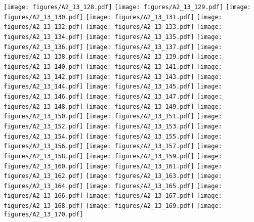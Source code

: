 \documentclass[12pt,a4paper]{article}
\begin{document}
\texttt{[image: figures/A2\_13\_128.pdf]}
\texttt{[image: figures/A2\_13\_129.pdf]}
\texttt{[image: figures/A2\_13\_130.pdf]}
\texttt{[image: figures/A2\_13\_131.pdf]}
\texttt{[image: figures/A2\_13\_132.pdf]}
\texttt{[image: figures/A2\_13\_133.pdf]}
\texttt{[image: figures/A2\_13\_134.pdf]}
\texttt{[image: figures/A2\_13\_135.pdf]}
\texttt{[image: figures/A2\_13\_136.pdf]}
\texttt{[image: figures/A2\_13\_137.pdf]}
\texttt{[image: figures/A2\_13\_138.pdf]}
\texttt{[image: figures/A2\_13\_139.pdf]}
\texttt{[image: figures/A2\_13\_140.pdf]}
\texttt{[image: figures/A2\_13\_141.pdf]}
\texttt{[image: figures/A2\_13\_142.pdf]}
\texttt{[image: figures/A2\_13\_143.pdf]}
\texttt{[image: figures/A2\_13\_144.pdf]}
\texttt{[image: figures/A2\_13\_145.pdf]}
\texttt{[image: figures/A2\_13\_146.pdf]}
\texttt{[image: figures/A2\_13\_147.pdf]}
\texttt{[image: figures/A2\_13\_148.pdf]}
\texttt{[image: figures/A2\_13\_149.pdf]}
\texttt{[image: figures/A2\_13\_150.pdf]}
\texttt{[image: figures/A2\_13\_151.pdf]}
\texttt{[image: figures/A2\_13\_152.pdf]}
\texttt{[image: figures/A2\_13\_153.pdf]}
\texttt{[image: figures/A2\_13\_154.pdf]}
\texttt{[image: figures/A2\_13\_155.pdf]}
\texttt{[image: figures/A2\_13\_156.pdf]}
\texttt{[image: figures/A2\_13\_157.pdf]}
\texttt{[image: figures/A2\_13\_158.pdf]}
\texttt{[image: figures/A2\_13\_159.pdf]}
\texttt{[image: figures/A2\_13\_160.pdf]}
\texttt{[image: figures/A2\_13\_161.pdf]}
\texttt{[image: figures/A2\_13\_162.pdf]}
\texttt{[image: figures/A2\_13\_163.pdf]}
\texttt{[image: figures/A2\_13\_164.pdf]}
\texttt{[image: figures/A2\_13\_165.pdf]}
\texttt{[image: figures/A2\_13\_166.pdf]}
\texttt{[image: figures/A2\_13\_167.pdf]}
\texttt{[image: figures/A2\_13\_168.pdf]}
\texttt{[image: figures/A2\_13\_169.pdf]}
\texttt{[image: figures/A2\_13\_170.pdf]}
\end{document}
